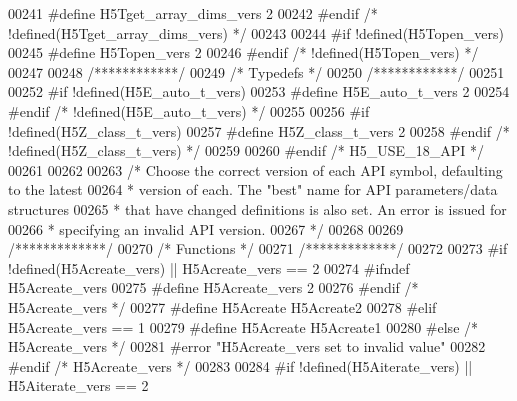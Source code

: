 \begin{DoxyCode}
00241 \textcolor{preprocessor}{  #define H5Tget\_array\_dims\_vers 2}
00242 \textcolor{preprocessor}{#endif }\textcolor{comment}{/* !defined(H5Tget\_array\_dims\_vers) */}\textcolor{preprocessor}{}
00243 
00244 \textcolor{preprocessor}{#if !defined(H5Topen\_vers)}
00245 \textcolor{preprocessor}{  #define H5Topen\_vers 2}
00246 \textcolor{preprocessor}{#endif }\textcolor{comment}{/* !defined(H5Topen\_vers) */}\textcolor{preprocessor}{}
00247 
00248 \textcolor{comment}{/************/}
00249 \textcolor{comment}{/* Typedefs */}
00250 \textcolor{comment}{/************/}
00251 
00252 \textcolor{preprocessor}{#if !defined(H5E\_auto\_t\_vers)}
00253 \textcolor{preprocessor}{  #define H5E\_auto\_t\_vers 2}
00254 \textcolor{preprocessor}{#endif }\textcolor{comment}{/* !defined(H5E\_auto\_t\_vers) */}\textcolor{preprocessor}{}
00255 
00256 \textcolor{preprocessor}{#if !defined(H5Z\_class\_t\_vers)}
00257 \textcolor{preprocessor}{  #define H5Z\_class\_t\_vers 2}
00258 \textcolor{preprocessor}{#endif }\textcolor{comment}{/* !defined(H5Z\_class\_t\_vers) */}\textcolor{preprocessor}{}
00259 
00260 \textcolor{preprocessor}{#endif }\textcolor{comment}{/* H5\_USE\_18\_API */}\textcolor{preprocessor}{}
00261 
00262 
00263 \textcolor{comment}{/* Choose the correct version of each API symbol, defaulting to the latest}
00264 \textcolor{comment}{ *      version of each.  The "best" name for API parameters/data structures}
00265 \textcolor{comment}{ *      that have changed definitions is also set.  An error is issued for}
00266 \textcolor{comment}{ *      specifying an invalid API version.}
00267 \textcolor{comment}{ */}
00268 
00269 \textcolor{comment}{/*************/}
00270 \textcolor{comment}{/* Functions */}
00271 \textcolor{comment}{/*************/}
00272 
00273 \textcolor{preprocessor}{#if !defined(H5Acreate\_vers) || H5Acreate\_vers == 2}
00274 \textcolor{preprocessor}{  #ifndef H5Acreate\_vers}
00275 \textcolor{preprocessor}{    #define H5Acreate\_vers 2}
00276 \textcolor{preprocessor}{  #endif }\textcolor{comment}{/* H5Acreate\_vers */}\textcolor{preprocessor}{}
00277 \textcolor{preprocessor}{  #define H5Acreate H5Acreate2}
00278 \textcolor{preprocessor}{#elif H5Acreate\_vers == 1}
00279 \textcolor{preprocessor}{  #define H5Acreate H5Acreate1}
00280 \textcolor{preprocessor}{#else }\textcolor{comment}{/* H5Acreate\_vers */}\textcolor{preprocessor}{}
00281 \textcolor{preprocessor}{  #error "H5Acreate\_vers set to invalid value"}
00282 \textcolor{preprocessor}{#endif }\textcolor{comment}{/* H5Acreate\_vers */}\textcolor{preprocessor}{}
00283 
00284 \textcolor{preprocessor}{#if !defined(H5Aiterate\_vers) || H5Aiterate\_vers == 2}

\end{DoxyCode}
